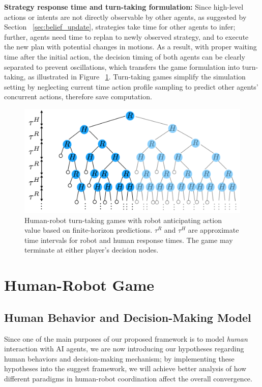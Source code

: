 \documentclass[letterpaper, 10 pt, conference]{ieeeconf}  %
\begin{document}
\textbf{Strategy response time and turn-taking formulation:}
Since high-level actions or intents are not directly observable by other 
agents, as suggested by Section ~\ref{sec:belief_update}, strategies take time 
for other agents to infer; further, agents need time to replan to newly 
observed strategy, and to execute the new plan with potential changes in 
motions. As a result, with proper waiting time after the initial action, the 
decision timing of both agents can be clearly separated to prevent 
oscillations, which transfers the game formulation into turn-taking, as 
illustrated in Figure ~\ref{fig:turn_taking}. 
Turn-taking games simplify the 
simulation setting by neglecting current time action profile sampling to 
predict other agents' concurrent actions, therefore save computation. 
\begin{figure}[t]
      \centering
      \vspace{-1em}
      \includegraphics[scale=0.2]{turn_taking}
      \vspace{-1.4em}
      \caption{
        Human-robot turn-taking games with robot anticipating action value based on finite-horizon predictions. $\tau^R$ and $\tau^H$ are approximate time intervals for robot and human response times. The game may terminate at either player's decision nodes.}
      \vspace{-1.7em}
     \label{fig:turn_taking}
\end{figure}
\section{Human-Robot Game}
\subsection{Human Behavior and Decision-Making Model}\label{sec:human_behavior}
Since one of the main purposes of our proposed framework is to model \textit{human} interaction with AI agents, we are now introducing our hypotheses regarding human behaviors and decision-making mechanism; by implementing these hypotheses into the suggest framework, we will achieve better analysis of how different paradigms in human-robot coordination affect the overall convergence.
\end{document}
